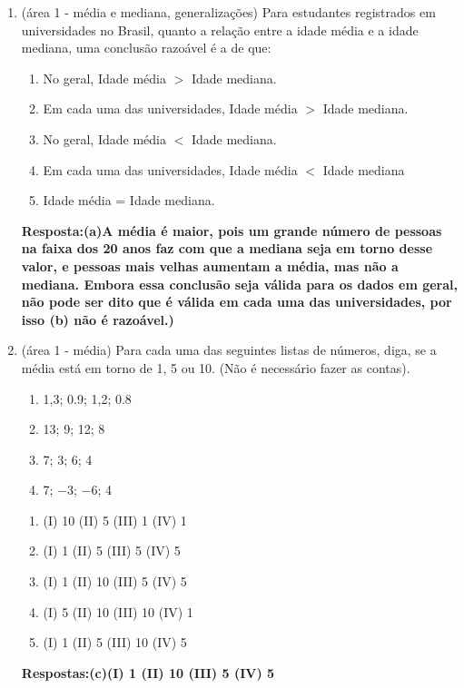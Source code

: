 \documentclass[12pt]{article}\documentclass[brazilian,12pt,a4paper,final]{article}
\begin{document}
\begin{enumerate}
\item (área 1 - média e mediana, generalizações) Para estudantes registrados em universidades no Brasil, quanto a relação entre a idade média e a idade mediana, uma conclusão razoável é a de que:
\begin{enumerate}
    \item No geral, Idade média $>$ Idade mediana.
    \item Em cada uma das universidades, Idade média $>$ Idade mediana.
    \item No geral, Idade média $<$ Idade mediana.
    \item Em cada uma das universidades, Idade média $<$ Idade mediana
    \item Idade média = Idade mediana.
\end{enumerate}

\textbf{Resposta:(a)A média é maior, pois um grande número de pessoas na faixa dos 20 anos faz com que a mediana seja em torno desse valor,  e pessoas mais velhas aumentam a média, mas não a mediana. Embora essa conclusão seja válida para os dados em geral, não pode ser dito que é válida em cada uma das universidades, por isso (b) não é razoável.)}

\item (área 1 - média) Para cada uma das seguintes listas de números, diga, se a média está em torno de 1, 5 ou 10. (Não é necessário fazer as contas).
\begin{enumerate}[label=(\Roman*)]
\item1,3; 0.9; 1,2; 0.8 
\item13; 9; 12; 8
\item7; 3; 6; 4 
\item7; −3; −6; 4
\end{enumerate}
\begin{enumerate}
    \item (I) 10 (II) 5 (III) 1 (IV) 1
    \item (I) 1 (II) 5 (III) 5 (IV) 5
    \item (I) 1 (II) 10 (III) 5 (IV) 5
    \item (I) 5 (II) 10 (III) 10 (IV) 1
    \item (I) 1 (II) 5 (III) 10 (IV) 5
    
\end{enumerate}

\textbf{Respostas:(c)(I) 1 (II) 10 (III) 5 (IV) 5}


\end{enumerate}
\end{document}
